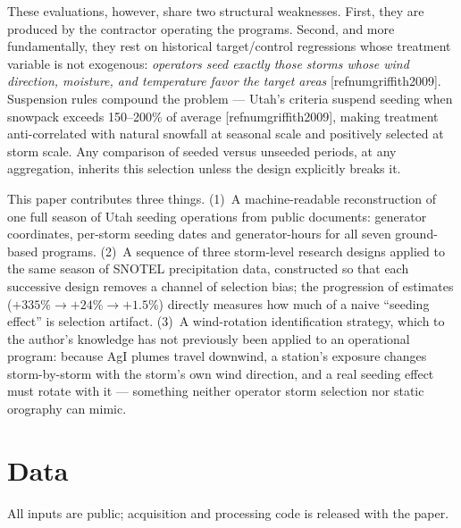 \documentclass[9pt,twocolumn,twoside]{article}
\newcommand{\citeparen}[1]{[\csname refnum#1\endcsname]}
\begin{document}
These evaluations, however, share two structural weaknesses. First, they are
produced by the contractor operating the programs. Second, and more
fundamentally, they rest on historical target/control regressions whose
treatment variable is not exogenous: \emph{operators seed exactly those
storms whose wind direction, moisture, and temperature favor the target
areas} \citeparen{griffith2009}. Suspension rules compound the problem ---
Utah's criteria suspend seeding when snowpack exceeds 150--200\% of average
\citeparen{griffith2009}, making treatment anti-correlated with natural
snowfall at seasonal scale and positively selected at storm scale. Any
comparison of seeded versus unseeded periods, at any aggregation, inherits
this selection unless the design explicitly breaks it.

This paper contributes three things. (1)~A machine-readable reconstruction
of one full season of Utah seeding operations from public documents:
generator coordinates, per-storm seeding dates and generator-hours for all
seven ground-based programs. (2)~A sequence of three storm-level research
designs applied to the same season of SNOTEL precipitation data, constructed
so that each successive design removes a channel of selection bias; the
progression of estimates ($+335\% \rightarrow +24\% \rightarrow +1.5\%$)
directly measures how much of a naive ``seeding effect'' is selection
artifact. (3)~A wind-rotation identification strategy, which to the author's
knowledge has not previously been applied to an operational program: because
AgI plumes travel downwind, a station's exposure changes storm-by-storm with
the storm's own wind direction, and a real seeding effect must rotate with
it --- something neither operator storm selection nor static orography can
mimic.

\section{Data}

All inputs are public; acquisition and processing code is released with the
paper.
\end{document}
